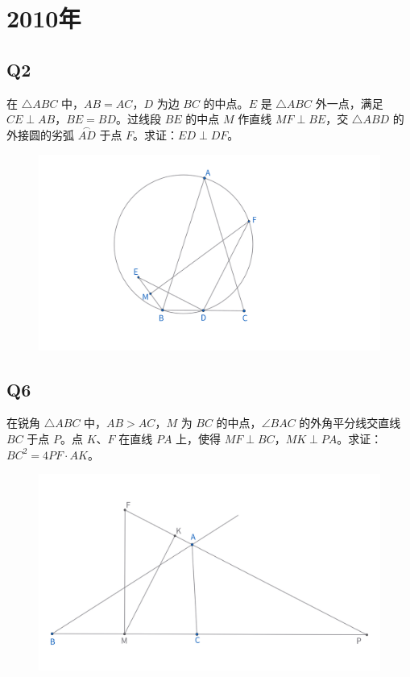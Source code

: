 \documentclass{article}
\begin{document}
\newpage
\section{2010年}
\subsection{Q2}
在 $\triangle ABC$ 中，$AB = AC$，$D$ 为边 $BC$ 的中点。$E$ 是 $\triangle ABC$ 外一点，满足 $CE \perp AB$，$BE = BD$。过线段 $BE$ 的中点 $M$ 作直线 $MF \perp BE$，交 $\triangle ABD$ 的外接圆的劣弧 $\overset{\frown}{AD}$ 于点 $F$。求证：$ED \perp DF$。
\begin{figure}[htbp]
    \centering
    \includegraphics[width=0.8\linewidth]{figures/女子赛10年Q2.png}
\end{figure}

\subsection{Q6}
在锐角 $\triangle ABC$ 中，$AB > AC$，$M$ 为 $BC$ 的中点，$\angle BAC$ 的外角平分线交直线 $BC$ 于点 $P$。点 $K$、$F$ 在直线 $PA$ 上，使得 $MF \perp BC$，$MK \perp PA$。求证：$BC^2 = 4PF \cdot AK$。
\begin{figure}[htbp]
    \centering
    \includegraphics[width=0.8\linewidth]{figures/女子赛10年Q6.png}
\end{figure}
\end{document}
